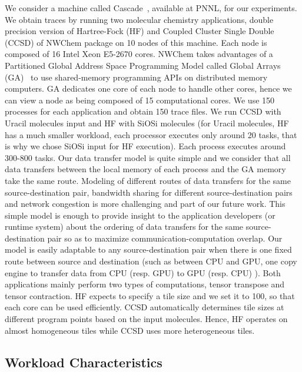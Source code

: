 \documentclass[sigconf]{acmart}
\begin{document}
{		We consider a machine called Cascade~\cite{Cascade}, available at PNNL, for our experiments. We obtain traces by running two molecular chemistry applications, double precision version of Hartree-Fock (HF) and Coupled Cluster Single Double (CCSD) of NWChem package on 10 nodes of this machine. Each node is composed of 16 Intel Xeon E5-2670 cores. NWChem takes advantages of a Partitioned Global Address Space Programming Model called Global Arrays (GA)~\cite{GlobalArray} to use shared-memory programming APIs on distributed memory computers. GA dedicates one core of each node to handle other cores, hence we can view a node as being composed of 15 computational cores. We use 150 processes for each application and obtain 150 trace files. We run CCSD with Uracil molecules input and HF with SiOSi molecules (for Uracil molecules, HF has a much smaller workload, each processor executes only around 20 tasks, that is why we chose SiOSi input for HF execution). Each process executes around 300-800 tasks. Our data transfer model is quite simple and we consider that all data transfers between the local memory of each process and the GA memory take the same route. Modeling of different routes of data transfers for the same source-destination pair, bandwidth sharing for different source-destination pairs and network congestion is more challenging and part of our future work. This simple model is enough to provide insight to the application developers (or runtime system) about the ordering of data transfers for the same source-destination pair so as to maximize communication-computation overlap. Our model is easily adaptable to any source-destination pair when there is one fixed route between source and destination (such as between CPU and GPU, one copy engine to transfer data from CPU (resp. GPU) to GPU (resp. CPU) ).
		Both applications mainly perform two types of computations, tensor transpose and tensor contraction. HF expects to specify a tile size and we set it to 100, so that each core can be used efficiently. CCSD automatically determines tile sizes at different program points based on the input molecules. Hence, HF operates on almost homogeneous tiles while CCSD uses more heterogeneous tiles.
		
		\subsection{Workload Characteristics}
		
		
}
\end{document}
